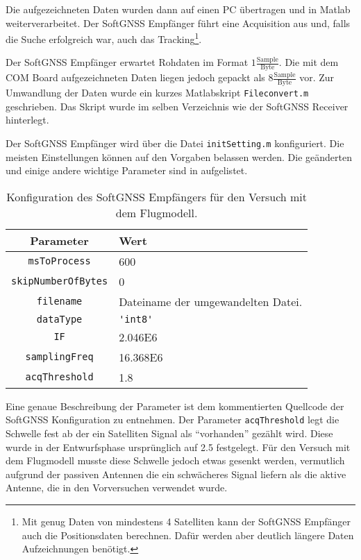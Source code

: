 Die aufgezeichneten Daten wurden dann auf einen PC übertragen und in Matlab weiterverarbeitet. Der SoftGNSS Empfänger führt eine Acquisition aus und, falls die Suche erfolgreich war, auch das Tracking\footnote{Mit genug Daten von mindestens 4 Satelliten kann der SoftGNSS Empfänger auch die Positionsdaten berechnen. Dafür werden aber deutlich längere Daten Aufzeichnungen benötigt.}.

Der SoftGNSS Empfänger erwartet Rohdaten im Format $1\frac{\textrm{Sample}}{\textrm{Byte}}$. Die mit dem COM Board aufgezeichneten Daten liegen jedoch gepackt als $8\frac{\textrm{Sample}}{\textrm{Byte}}$ vor. Zur Umwandlung der Daten wurde ein kurzes Matlabskript \lstinline$Fileconvert.m$ geschrieben. Das Skript wurde im selben Verzeichnis wie der SoftGNSS Receiver hinterlegt.

Der SoftGNSS Empfänger wird über die Datei \lstinline$initSetting.m$ konfiguriert. Die meisten Einstellungen können auf den Vorgaben belassen werden. Die geänderten und einige andere wichtige Parameter sind in  aufgelistet.

\begin{table}[htbp]
    \ttabbox
    {
        \caption[Konfiguration des SoftGNSS Empfängers]{Konfiguration des SoftGNSS Empfängers für den Versuch mit dem \dscubesat Flugmodell.}
        \label{SoftGNSSConfig}
    }
    {
    \begin{tabular}{c p{3.5cm}}
        \toprule
        Parameter               & Wert \\
        \midrule
        \lstinline$msToProcess$         & \num{600} \\
        \lstinline$skipNumberOfBytes$   & \num{0} \\
        \lstinline$filename$            & Dateiname der umgewandelten Datei. \\
        \lstinline$dataType$            & \lstinline$'int8'$ \\
        \lstinline[language={}]$IF$   & \num{2.046E6} \\
        \lstinline$samplingFreq$        & \num{16.368E6} \\
        \lstinline$acqThreshold$        & \num{1.8} \\
        \bottomrule
    \end{tabular}
}
\end{table}

Eine genaue Beschreibung der Parameter ist dem kommentierten Quellcode der SoftGNSS Konfiguration zu entnehmen. Der Parameter \lstinline$acqThreshold$ legt die Schwelle fest ab der ein Satelliten Signal als \enquote{vorhanden} gezählt wird. Diese wurde in der Entwurfsphase ursprünglich auf \num{2.5} festgelegt. Für den Versuch mit dem Flugmodell musste diese Schwelle jedoch etwas gesenkt werden, vermutlich aufgrund der passiven Antennen die ein schwächeres Signal liefern als die aktive Antenne, die in den Vorversuchen verwendet wurde.

